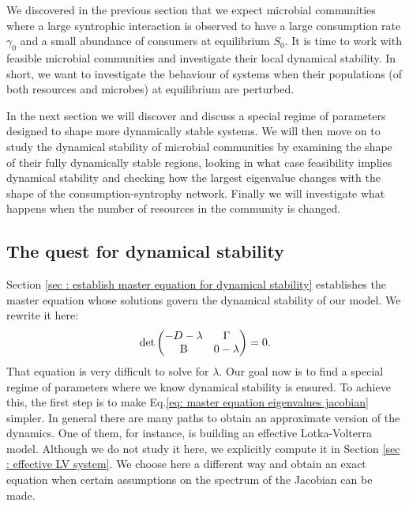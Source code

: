\documentclass[12pt, titlepage]{report}
\begin{document}
We discovered in the previous section that we expect microbial communities where a large syntrophic interaction is observed to have a large consumption rate $\gamma_0$ and a small abundance of consumers at equilibrium $S_0$. It is time to work with feasible microbial communities and investigate their local dynamical stability. In short, we want to investigate the behaviour of systems when their populations (of both resources and microbes) at equilibrium are perturbed.

In the next section we will discover and discuss a special regime of parameters designed to shape more dynamically stable systems. We will then move on to study the dynamical stability of microbial communities by examining the shape of their fully dynamically stable regions, looking in what case feasibility implies dynamical stability and checking how the largest eigenvalue changes with the shape of the consumption-syntrophy network. Finally we will investigate what happens when the number of resources in the community is changed.

\subsection{The quest for dynamical stability}
Section \ref{sec : establish master equation for dynamical stability} establishes the master equation
whose solutions govern the dynamical stability of our model. We rewrite it here:
\begin{equation}
\det
\begin{pmatrix}
 -D - \lambda  & \Gamma \\
 \text{B} & 0-\lambda
\end{pmatrix} = 0.
\label{eq: master equation eigenvalues jacobian}
\end{equation}
That equation is very difficult to solve for $\lambda$. Our goal now is to find a special regime of parameters where we know dynamical stability is ensured. To achieve this, the first step is to make Eq.\eqref{eq: master equation eigenvalues jacobian} simpler.
In general there are many paths to obtain an approximate version of the dynamics. One of them, for instance, is building an effective Lotka-Volterra model. Although we do not study it here, we explicitly compute it in Section \ref{sec : effective LV system}. We choose here a different way and obtain an exact equation when certain assumptions on the spectrum of the Jacobian can be made.
\end{document}
